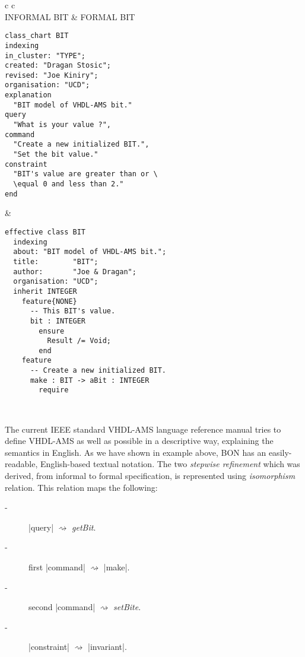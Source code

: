 \begin{center}
\begin{tabular}{ c  c }
\\ 
INFORMAL BIT & FORMAL BIT \\ 
\begin{minipage}[l]{6.4cm} 
\begin{lstlisting}[language=Bon]
class_chart BIT
indexing
in_cluster: "TYPE";
created: "Dragan Stosic";
revised: "Joe Kiniry";
organisation: "UCD";
explanation
  "BIT model of VHDL-AMS bit."
query
  "What is your value ?",
command
  "Create a new initialized BIT.",
  "Set the bit value."
constraint
  "BIT's value are greater than or \
  \equal 0 and less than 2."
end
\end{lstlisting}

\end{minipage}  
&
\begin{minipage}[l]{6.6cm}
\begin{lstlisting}[language=Bon]
effective class BIT
  indexing
  about: "BIT model of VHDL-AMS bit.";
  title:        "BIT";
  author:       "Joe & Dragan";
  organisation: "UCD"; 
  inherit INTEGER
    feature{NONE}
      -- This BIT's value.
      bit : INTEGER 
        ensure
          Result /= Void;
        end
    feature
      -- Create a new initialized BIT.
      make : BIT -> aBit : INTEGER
        require   
\end{lstlisting}
\end{minipage}\\
\begin{minipage}[l]{6.4cm} 
The current IEEE standard VHDL-AMS language reference manual 
tries to define VHDL-AMS as well as possible in a descriptive way, 
explaining the semantics in English. As we have shown in example above,
BON has an easily-readable, English-based textual notation.
The two \emph{stepwise refinement} which was derived, 
from informal to formal specification, 
is represented using \emph{isomorphism} relation. 
This relation maps the following:
\begin{description}
\item[-] \lstinlinenb|query| $\rightsquigarrow$ \emph{getBit}.
\item[-] first \lstinlinenb|command| $\rightsquigarrow$ \lstinlinenb|make|.
\item[-] second \lstinlinenb|command| $\rightsquigarrow$ \emph{setBite}.
\item[-] \lstinlinenb|constraint| $\rightsquigarrow$ \lstinlinenb|invariant|.
\end{description}

\end{minipage}
\end{tabular}
\end{center}
